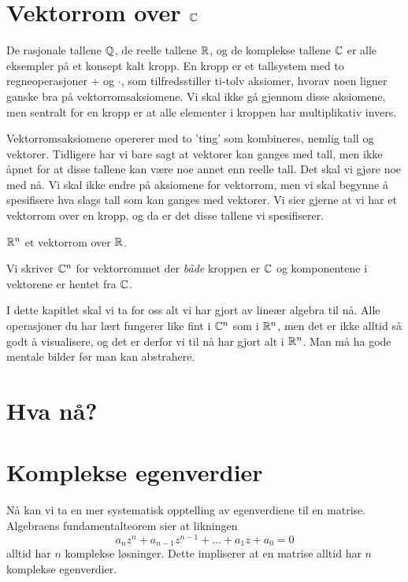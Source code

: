 

\label{ch:kompleks-linear-algebra}

\section*{Vektorrom over $\mathbb{C}$}

De rasjonale tallene $\mathbb{Q}$, de reelle tallene $\mathbb{R}$, og de komplekse tallene $\mathbb{C}$ er alle eksempler på et konsept kalt kropp. En kropp er et tallsystem med to regneoperasjoner $+$ og $\cdot$, som tilfredsstiller ti-tolv aksiomer, hvorav noen ligner ganske bra på vektorromsaksiomene. Vi skal ikke gå gjennom disse aksiomene, men sentralt for en kropp er at alle elementer i kroppen har multiplikativ invers.

Vektorromsaksiomene opererer med to 'ting' som kombineres, nemlig tall og vektorer. Tidligere har vi bare sagt at vektorer kan ganges med tall, men ikke åpnet for at disse tallene kan være noe annet enn reelle tall. Det skal vi gjøre noe med nå. Vi skal ikke endre på aksiomene for vektorrom, men vi skal begynne å spesifisere hva slags tall som kan ganges med vektorer. Vi sier gjerne at vi har et vektorrom over en kropp, og da er det disse tallene vi spesifiserer. 
\begin{ex}
$\mathbb{R}^n$ et vektorrom over $\mathbb{R}$.
\end{ex}
\begin{ex}
Vi skriver $\mathbb{C}^n$ for vektorrommet der \emph{både} kroppen er $\mathbb{C}$ og komponentene i vektorene er hentet fra $\mathbb{C}$.
\end{ex}
I dette kapitlet skal vi ta for oss alt vi har gjort av lineær algebra til nå. Alle operasjoner du har lært fungerer like fint i $\mathbb{C}^n$ som i $\mathbb{R}^n$, men det er ikke alltid så godt å visualisere, og det er derfor vi til nå har gjort alt i $\mathbb{R}^n$. Man må ha gode mentale bilder før man kan abstrahere.

\section*{Hva nå?}

\section*{Komplekse egenverdier}
Nå kan vi ta en mer systematisk opptelling av egenverdiene til en matrise. Algebraens fundamentalteorem sier at likningen
\[
a_nz^n+a_{n-1}z^{n-1}+...+a_1z+a_0=0
\]
alltid har $n$ komplekse løsninger. Dette impliserer at en matrise alltid har $n$ komplekse egenverdier.


\kapittelslutt
